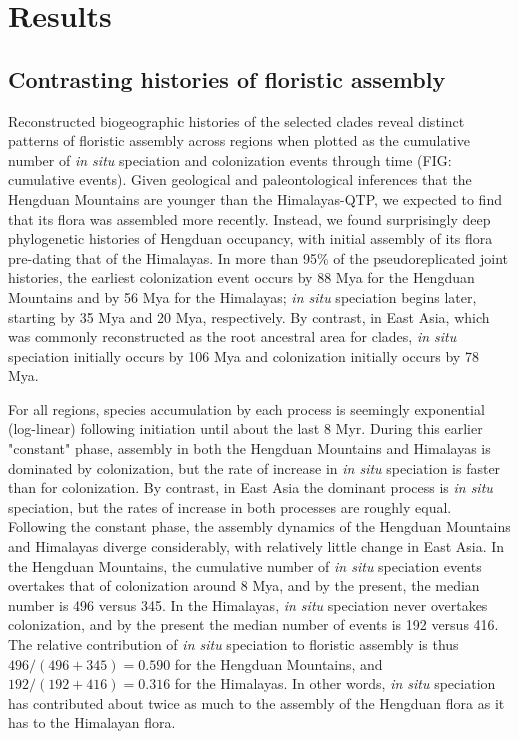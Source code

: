 \section{Results}

\subsection{Contrasting histories of floristic assembly}

Reconstructed biogeographic histories of the selected clades reveal distinct patterns of floristic assembly across regions when plotted as the cumulative number of \textit{in situ} speciation and colonization events through time (FIG: cumulative events). Given geological and paleontological inferences that the Hengduan Mountains are younger than the Himalayas-QTP, we expected to find that its flora was assembled more recently. Instead, we found surprisingly deep phylogenetic histories of Hengduan occupancy, with initial assembly of its flora pre-dating that of the Himalayas. In more than 95\% of the pseudoreplicated joint histories, the earliest colonization event occurs by 88 Mya for the Hengduan Mountains and by 56 Mya for the Himalayas; \textit{in situ} speciation begins later, starting by 35 Mya and 20 Mya, respectively. By contrast, in East Asia, which was commonly reconstructed as the root ancestral area for clades, \textit{in situ} speciation initially occurs by 106 Mya and colonization initially occurs by 78 Mya.

For all regions, species accumulation by each process is seemingly exponential (log-linear) following initiation until about the last 8 Myr. During this earlier "constant" phase, assembly in both the Hengduan Mountains and Himalayas is dominated by colonization, but the rate of increase in \textit{in situ} speciation is faster than for colonization. By contrast, in East Asia the dominant process is \textit{in situ} speciation, but the rates of increase in both processes are roughly equal. Following the constant phase, the assembly dynamics of the Hengduan Mountains and Himalayas diverge considerably, with relatively little change in East Asia. In the Hengduan Mountains, the cumulative number of \textit{in situ} speciation events overtakes that of colonization around 8 Mya, and by the present, the median number is 496 versus 345. In the Himalayas, \textit{in situ} speciation never overtakes colonization, and by the present the median number of events is 192 versus 416. The relative contribution of \textit{in situ} speciation to floristic assembly is thus $496/(496+345) = 0.590$ for the Hengduan Mountains, and $192/(192+416) = 0.316$ for the Himalayas. In other words, \textit{in situ} speciation has contributed about twice as much to the assembly of the Hengduan flora as it has to the Himalayan flora.

